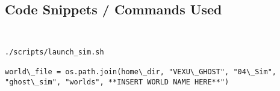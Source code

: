 

\subsection*{Code Snippets / Commands Used}
\begin{lstlisting}
    
\end{lstlisting}
\begin{lstlisting}
./scripts/launch_sim.sh
    
world\_file = os.path.join(home\_dir, "VEXU\_GHOST", "04\_Sim", "ghost\_sim", "worlds", **INSERT WORLD NAME HERE**")
\end{lstlisting}



